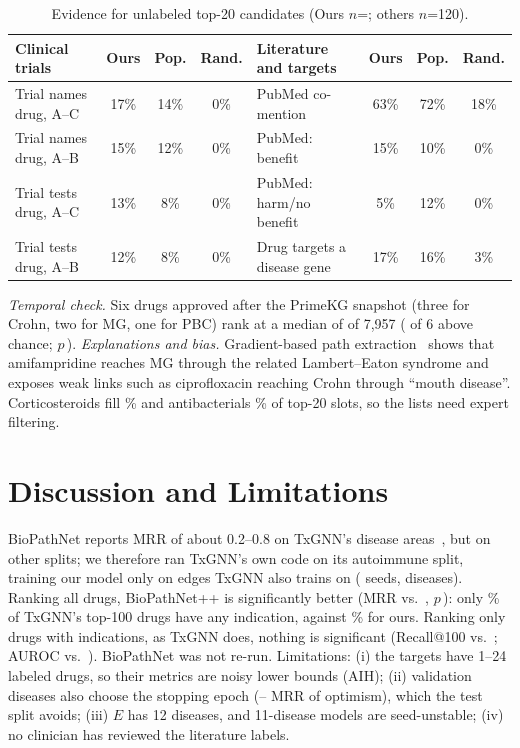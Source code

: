 \documentclass{svproc}
\newcommand{\sysname}{BioPathNet++\xspace}
\begin{document}
\begin{table}[t]
\centering
\caption{Evidence for unlabeled top-20 candidates (Ours $n$=\ValNovelN; others $n$=120).}
\label{tab:validation}
\scriptsize
\setlength{\tabcolsep}{3pt}
\begin{tabular}{lccc@{\hspace{14pt}}lccc}
\toprule
Clinical trials & Ours & Pop. & Rand. & Literature and targets & Ours & Pop. & Rand.\\
\midrule
Trial names drug, A--C & 17\% & 14\% & 0\% & PubMed co-mention & 63\% & 72\% & 18\%\\
Trial names drug, A--B & 15\% & 12\% & 0\% & PubMed: benefit & 15\% & 10\% & 0\%\\
Trial tests drug, A--C & 13\% & 8\% & 0\% & PubMed: harm/no benefit & 5\% & 12\% & 0\%\\
Trial tests drug, A--B & 12\% & 8\% & 0\% & Drug targets a disease gene & 17\% & 16\% & 3\%\\
\bottomrule
\end{tabular}
\end{table}
\emph{Temporal check.} Six drugs approved after the PrimeKG snapshot (three for Crohn, two for MG, one for PBC) rank at a median of \TempPostMedRank{} of 7,957 (\TempPostBetter{} of 6 above chance; $p$\,\TempPostP).
\emph{Explanations and bias.} Gradient-based path extraction~\citep{zhu2021nbfnet} shows that amifampridine reaches MG through the related Lambert--Eaton syndrome and exposes weak links such as ciprofloxacin reaching Crohn through ``mouth disease''. Corticosteroids fill \ValSteroidShare\% and antibacterials \ValAntibioticShare\% of top-20 slots, so the lists need expert filtering.

\section{Discussion and Limitations}
BioPathNet reports MRR of about 0.2--0.8 on TxGNN's disease areas~\citep{hu2026biopathnet}, but on other splits; we therefore ran TxGNN's own code on its autoimmune split, training our model only on edges TxGNN also trains on (\TxhSeedsTx{} seeds, \TxhN{} diseases). Ranking all drugs, \sysname is significantly better (MRR \TxhOursMrr{} vs.\ \TxhTxMrr, $p$\,\TxhPwilFullMrr): only \TxhTxIndShare\% of TxGNN's top-100 drugs have any indication, against \TxhOursIndShare\% for ours. Ranking only drugs with indications, as TxGNN does, nothing is significant (Recall@100 \TxhOursRecall{} vs.\ \TxhTxRecall; AUROC \TxhOursAuroc{} vs.\ \TxhTxAuroc). BioPathNet was not re-run.
Limitations: (i) the targets have 1--24 labeled drugs, so their metrics are noisy lower bounds (AIH); (ii) validation diseases also choose the stopping epoch (\SelGapMainMin--\SelGapMainMax{} MRR of optimism), which the test split avoids; (iii) $E$ has 12 diseases, and 11-disease models are seed-unstable; (iv) no clinician has reviewed the literature labels.
\end{document}
